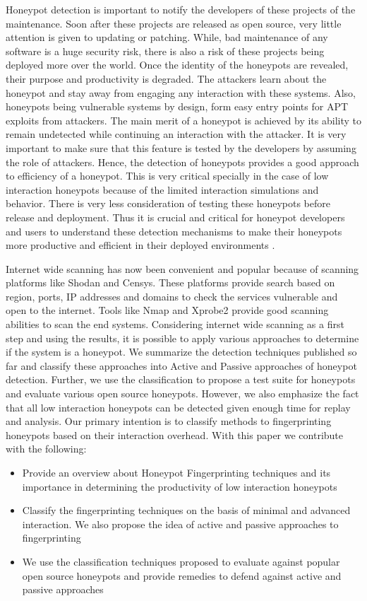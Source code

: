 \documentclass[letterpaper, 10 pt, conference]{ieeeconf}  %
\begin{document}
Honeypot detection is important to notify the developers of these projects of the maintenance. Soon after these projects are released as open source, very little attention is given to updating or patching. While, bad maintenance of any software is a huge security risk, there is also a risk of these projects being deployed more over the world. Once the identity of the honeypots are revealed, their purpose and productivity is degraded. The attackers learn about the honeypot and stay away from engaging any interaction with these systems. Also, honeypots being vulnerable systems by design, form easy entry points for APT exploits from attackers. The main merit of a honeypot is achieved by its ability to remain undetected while continuing an interaction with the attacker. It is very important to make sure that this feature is tested by the developers by assuming the role of attackers. Hence, the detection of honeypots provides a good approach to efficiency of a honeypot. This is very critical specially in the case of low interaction honeypots because of the limited interaction simulations and behavior. There is very less consideration of testing these honeypots before release and deployment. Thus it is crucial and critical for honeypot developers and users to understand these detection mechanisms to make their honeypots more productive and efficient in their deployed environments . 


Internet wide scanning has now been convenient and popular because of scanning platforms like Shodan and Censys. These platforms provide search based on region, ports, IP addresses and domains to check the services vulnerable and  open to the internet. Tools like Nmap and Xprobe2 provide good scanning abilities to scan the end systems. Considering internet wide scanning as a first step and using the results, it is possible to apply various approaches to determine if the system is a honeypot. We summarize the detection techniques published so far and classify these approaches into Active and Passive approaches of honeypot detection. Further, we use the classification to propose a test suite for honeypots and evaluate various open source honeypots. However, we also emphasize the fact that all low interaction honeypots can be detected given enough time for replay and analysis. Our primary intention is to classify methods to fingerprinting honeypots based on their interaction overhead. With this paper we contribute with the following:

 \begin{itemize}
    \item Provide an overview about Honeypot Fingerprinting techniques and its importance in determining the productivity of low interaction honeypots 
    \item Classify the fingerprinting techniques on the basis of minimal and advanced interaction. We also propose the idea of active and passive approaches to fingerprinting
    \item We use the classification techniques proposed to evaluate against popular open source honeypots and provide remedies to defend against active and passive approaches 
 \end{itemize}
\end{document}
